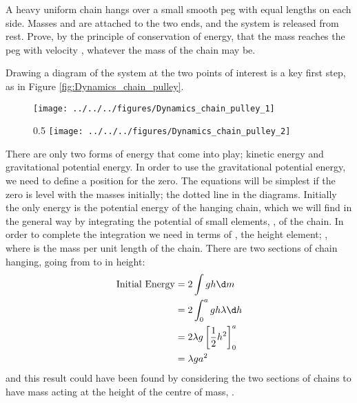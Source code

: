 

\begin{problem} %
 {A heavy uniform chain hangs over a small smooth peg with equal lengths  on each side.  Masses  and  are attached to the two ends, and the system is released from rest.  Prove, by the principle of conservation of energy, that the mass  reaches the peg with velocity , whatever the mass of the chain may be.}
{}
{Drawing a diagram of the system at the two points of interest is a key first step, as in Figure \ref{fig:Dynamics_chain_pulley}.

\begin{figure}[h]
  \centering
 	\texttt{[image: ../../../figures/Dynamics\_chain\_pulley\_1]}
	\caption{}\label{fig:Dynamics_chain_pulley_1}
\end{figure}
\begin{figure}{0.5\textwidth}
	\centering
	\texttt{[image: ../../../figures/Dynamics\_chain\_pulley\_2]}
	\caption{}\label{fig:Dynamics_chain_pulley_2}
\end{figure}

There are only two forms of energy that come into play; kinetic energy and gravitational potential energy. In order to use the gravitational potential energy, we need to define a position for the zero. The equations will be simplest if the zero is level with the masses initially; the dotted line in the diagrams. Initially the only energy is the potential energy of the hanging chain, which we will find in the general way by integrating the potential of small elements, , of the chain. In order to complete the integration we need  in terms of , the height element; , where \vari{\lambda} is the mass per unit length of the chain. There are two sections of chain hanging, going from  to  in height:
\begin{eqnarray*} 
\text{Initial Energy} &= 2 \int gh \d m \\ 
&= 2 \int_{0}^{a} gh \lambda \d h \\ 
&= 2\lambda g\left[\frac{1}{2}h^{2}\right]_{0}^{a} \\ 
&= \lambda ga^{2} 
\end{eqnarray*}
and this result could have been found by considering the two sections of chains to have mass  acting at the height of the centre of mass, .

}
\end{problem}
